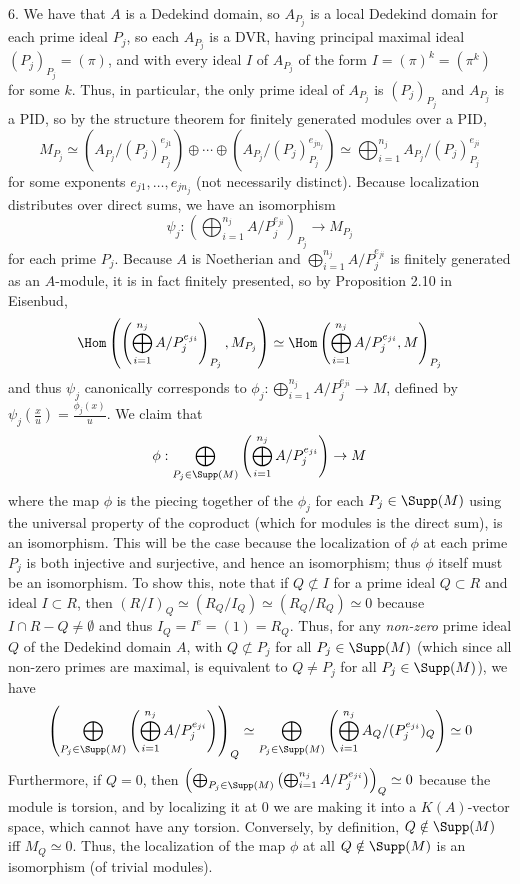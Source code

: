 \documentclass[11pt]{article}
\begin{document}
\num{6.} We have that $A$ is a Dedekind domain, so $A_{P_j}$ is a local Dedekind domain for each prime ideal $P_j$, so each $A_{P_j}$ is a DVR, having principal maximal ideal $(P_j)_{P_j}=(\pi)$, and with every ideal $I$ of $A_{P_j}$ of the form $I=(\pi)^k=(\pi^k)$ for some $k$. Thus, in particular, the only prime ideal of $A_{P_j}$ is $(P_j)_{P_j}$ and $A_{P_j}$ is a PID, so by the structure theorem for finitely generated modules over a PID, 
\[M_{P_j}\simeq (A_{P_j}/(P_j)_{P_j}^{e_{j1}})\oplus\cdots\oplus(A_{P_j}/(P_j)_{P_j}^{e_{jn_j}})\simeq\bigoplus_{i=1}^{n_j} A_{P_j}/(P_j)_{P_j}^{e_{ji}}\]
for some exponents $e_{j1},\ldots,e_{jn_j}$ (not necessarily distinct). Because localization distributes over direct sums, we have an isomorphism
\[\psi_j:\left(\bigoplus_{i=1}^{n_j} A/P_j^{e_{ji}}\right)_{P_j}\rightarrow M_{P_j}\]
for each prime $P_j$. Because $A$ is Noetherian and $\bigoplus_{i=1}^{n_j} A/P_j^{e_{ji}}$ is finitely generated as an $A$-module, it is in fact finitely presented, so by Proposition 2.10 in Eisenbud, 
\[\Hom\left(\left(\bigoplus_{i=1}^{n_j} A/P_j^{e_{ji}}\right)_{P_j},M_{P_j}\right)\simeq\Hom\left(\bigoplus_{i=1}^{n_j} A/P_j^{e_{ji}},M\right)_{P_j}\]
and thus $\psi_j$ canonically corresponds to $\phi_j:\bigoplus_{i=1}^{n_j} A/P_j^{e_{ji}}\rightarrow M$, defined by $\psi_j(\frac{x}{u})=\frac{\phi_j(x)}{u}$. We claim that 
\[\phi:\bigoplus_{P_j\in\Supp(M)}\left(\bigoplus_{i=1}^{n_j} A/P_j^{e_{ji}}\right)\rightarrow M\]
where the map $\phi$ is the piecing together of the $\phi_j$ for each $P_j\in\Supp(M)$ using the universal property of the coproduct (which for modules is the direct sum), is an isomorphism. This will be the case because the localization of $\phi$ at each prime $P_j$ is both injective and surjective, and hence an isomorphism; thus $\phi$ itself must be an isomorphism. To show this, note that if $Q\not\subset I$ for a prime ideal $Q\subset R$ and ideal $I\subset R$, then $(R/I)_Q\simeq(R_Q/I_Q)\simeq(R_Q/R_Q)\simeq0$ because $I\cap R-Q\neq\emptyset$ and thus $I_Q=I^e=(1)=R_Q$. Thus, for any \textit{non-zero} prime ideal $Q$ of the Dedekind domain $A$, with $Q\not\subset P_j$ for all $P_j\in\Supp(M)$ (which since all non-zero primes are maximal, is equivalent to $Q\neq P_j$ for all $P_j\in\Supp(M)$), we have
\[\left(\bigoplus_{P_j\in\Supp(M)}\left(\bigoplus_{i=1}^{n_j} A/P_j^{e_{ji}}\right)\right)_Q\simeq\bigoplus_{P_j\in\Supp(M)}\left(\bigoplus_{i=1}^{n_j} A_Q/(P_j^{e_{ji}})_Q\right)\simeq0 \]
Furthermore, if $Q=0$, then $\left(\bigoplus_{P_j\in\Supp(M)}\left(\bigoplus_{i=1}^{n_j} A/P_j^{e_{ji}}\right)\right)_Q\simeq 0$ because the module is torsion, and by localizing it at 0 we are making it into a $K(A)$-vector space, which cannot have any torsion. Conversely, by definition, $Q\notin\Supp(M)$ iff $M_Q\simeq 0$. Thus, the localization of the map $\phi$ at all $Q\notin\Supp(M)$ is an isomorphism (of trivial modules).\\
\end{document}
